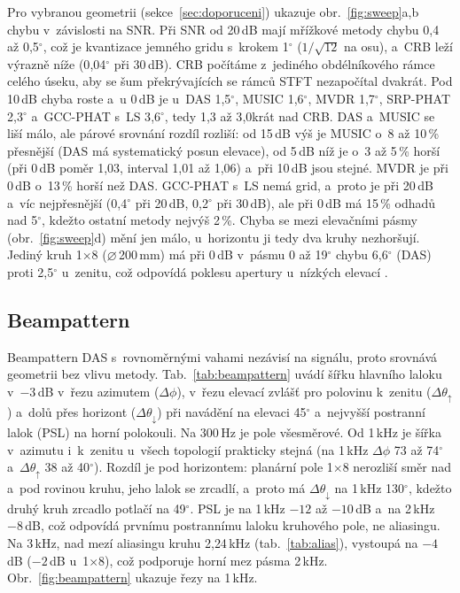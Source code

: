 \documentclass[conference]{IEEEtran}
\begin{document}
Pro vybranou geometrii (sekce~\ref{sec:doporuceni}) ukazuje obr.~\ref{fig:sweep}a,b chybu v~závislosti na SNR. Při SNR od 20\,dB mají mřížkové metody chybu 0{,}4 až 0{,}5$^\circ$, což je kvantizace jemného gridu s~krokem 1$^\circ$ ($1/\sqrt{12}$ na osu), a~CRB leží výrazně níže (0{,}04$^\circ$ při 30\,dB). CRB počítáme z~jediného obdélníkového rámce celého úseku, aby se šum překrývajících se rámců STFT nezapočítal dvakrát. Pod 10\,dB chyba roste a~u 0\,dB je u~DAS 1{,}5$^\circ$, MUSIC 1{,}6$^\circ$, MVDR 1{,}7$^\circ$, SRP-PHAT 2{,}3$^\circ$ a~GCC-PHAT s~LS 3{,}6$^\circ$, tedy 1{,}3 až 3{,}0krát nad CRB. DAS a~MUSIC se liší málo, ale párové srovnání rozdíl rozliší: od 15\,dB výš je MUSIC o~8 až 10\,\% přesnější (DAS má systematický posun elevace), od 5\,dB níž je o~3 až 5\,\% horší (při 0\,dB poměr 1{,}03, interval 1{,}01 až 1{,}06) a~při 10\,dB jsou stejné. MVDR je při 0\,dB o~13\,\% horší než DAS. GCC-PHAT s~LS nemá grid, a~proto je při 20\,dB a~víc nejpřesnější (0{,}4$^\circ$ při 20\,dB, 0{,}2$^\circ$ při 30\,dB), ale při 0\,dB má 15\,\% odhadů nad 5$^\circ$, kdežto ostatní metody nejvýš 2\,\%. Chyba se mezi elevačními pásmy (obr.~\ref{fig:sweep}d) mění jen málo, u~horizontu ji tedy dva kruhy nezhoršují. Jediný kruh 1$\times$8 ($\varnothing$\,200\,mm) má při 0\,dB v~pásmu 0 až 19$^\circ$ chybu 6{,}6$^\circ$ (DAS) proti 2{,}5$^\circ$ u~zenitu, což odpovídá poklesu apertury u~nízkých elevací \cite{altena2026joint}.

\subsection{Beampattern}
Beampattern DAS s~rovnoměrnými vahami nezávisí na signálu, proto srovnává geometrii bez vlivu metody. Tab.~\ref{tab:beampattern} uvádí šířku hlavního laloku v~$-3$\,dB v~řezu azimutem ($\Delta\phi$), v~řezu elevací zvlášť pro polovinu k~zenitu ($\Delta\theta_\uparrow$) a~dolů přes horizont ($\Delta\theta_\downarrow$) při navádění na elevaci 45$^\circ$ a~nejvyšší postranní lalok (PSL) na horní polokouli. Na 300\,Hz je pole všesměrové. Od 1\,kHz je šířka v~azimutu i~k~zenitu u~všech topologií prakticky stejná (na 1\,kHz $\Delta\phi$ 73 až 74$^\circ$ a~$\Delta\theta_\uparrow$ 38 až 40$^\circ$). Rozdíl je pod horizontem: planární pole 1$\times$8 nerozliší směr nad a~pod rovinou kruhu, jeho lalok se zrcadlí, a~proto má $\Delta\theta_\downarrow$ na 1\,kHz 130$^\circ$, kdežto druhý kruh zrcadlo potlačí na 49$^\circ$. PSL je na 1\,kHz $-12$ až $-10$\,dB a~na 2\,kHz $-8$\,dB, což odpovídá prvnímu postrannímu laloku kruhového pole, ne aliasingu. Na 3\,kHz, nad mezí aliasingu kruhu 2{,}24\,kHz (tab.~\ref{tab:alias}), vystoupá na $-4$\,dB ($-2$\,dB u~1$\times$8), což podporuje horní mez pásma 2\,kHz. Obr.~\ref{fig:beampattern} ukazuje řezy na 1\,kHz.
\end{document}
